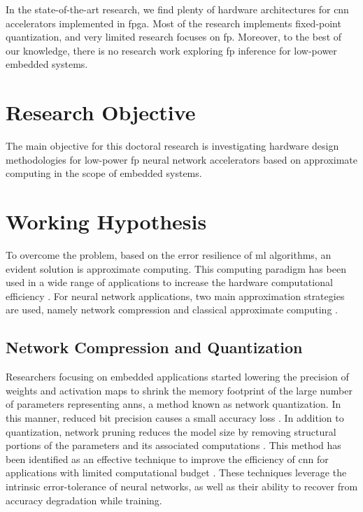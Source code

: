 In the state-of-the-art research, we find plenty of hardware architectures for \gls{cnn} accelerators implemented in \gls{fpga}. Most of the research implements fixed-point quantization, and very limited research focuses on \gls{fp}. Moreover, to the best of our knowledge, there is no research work exploring \gls{fp} inference for low-power embedded systems.

\section{Research Objective}
The main objective for this doctoral research is investigating hardware design methodologies for low-power \gls{fp} neural network accelerators based on approximate computing in the scope of embedded systems.

\section{Working Hypothesis}
To overcome the problem, based on the error resilience of \gls{ml} algorithms, an evident solution is approximate computing. This computing paradigm has been used in a wide range of applications to increase the hardware computational efficiency \cite{han2013approximate}. For neural network applications, two main approximation strategies are used, namely network compression and classical approximate computing \cite{bouvier2019spiking}.

\subsection{Network Compression and Quantization}
Researchers focusing on embedded applications started lowering the precision of weights and activation maps to shrink the memory footprint of the large number of parameters representing \gls{ann}s, a method known as network quantization. In this manner, reduced bit precision causes a small accuracy loss \cite{courbariaux2015binaryconnect, han2015deep, hubara2017quantized, rastegari2016xnor}. In addition to quantization, network pruning reduces the model size by removing structural portions of the parameters and its associated computations \cite{lecun1989optimal,hassibi1992second}. This method has been identified as an effective technique to improve the efficiency of \gls{cnn} for applications with limited computational budget \cite{molchanov2016pruning,li2016pruning, liu2018rethinking}. These techniques leverage the intrinsic error-tolerance of neural networks, as well as their ability to recover from accuracy degradation while training.

